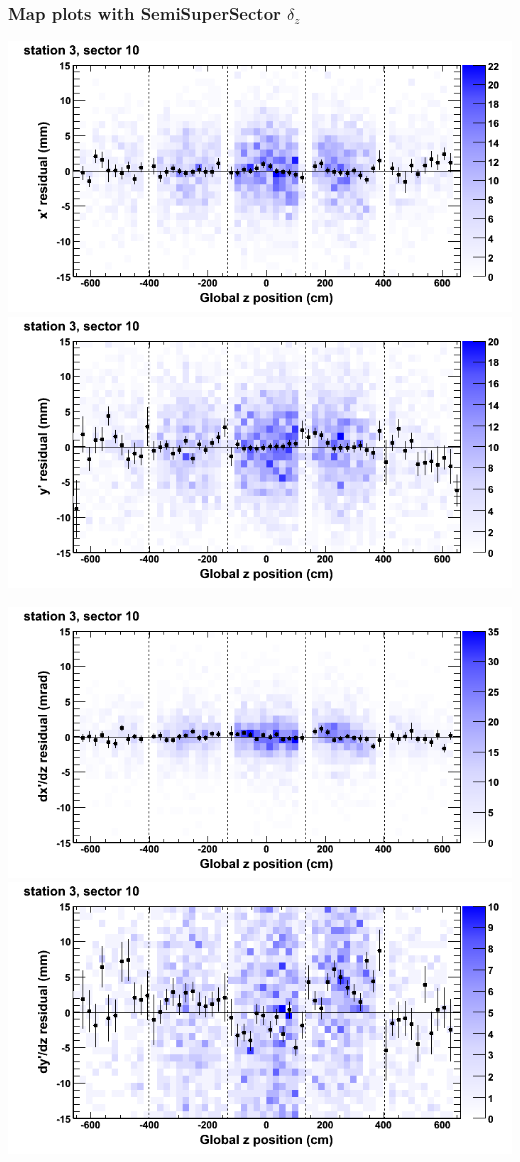 \documentclass[compress]{beamer}
\begin{document}
\begin{frame}
\frametitle{Map plots with SemiSuperSector $\delta_z$}
\includegraphics[width=0.5\linewidth]{zfit_mapplots/DTvsz_st3sec10_x.png}
\includegraphics[width=0.5\linewidth]{zfit_mapplots/DTvsz_st3sec10_y.png}

\includegraphics[width=0.5\linewidth]{zfit_mapplots/DTvsz_st3sec10_dxdz.png}
\includegraphics[width=0.5\linewidth]{zfit_mapplots/DTvsz_st3sec10_dydz.png}
\end{frame}
\end{document}
